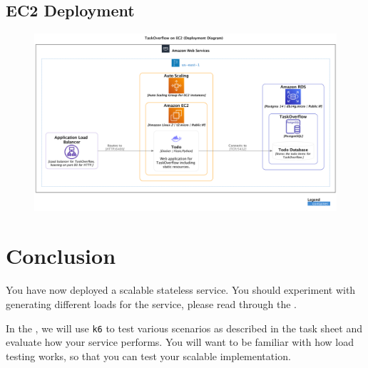 \documentclass{csse4400}
\begin{document}
\subsection{EC2 Deployment}


\begin{figure}[H]
  \includegraphics[trim=0 230 0 0,clip,width=\textwidth]{diagrams/ec2deployment}
\end{figure}


\section{Conclusion}
You have now deployed a scalable stateless service.
You should experiment with generating different loads for the service,
please read through the .

In the ,
we will use \texttt{k6} to test various scenarios as described in the task sheet and evaluate how your service performs.
You will want to be familiar with how load testing works,
so that you can test your scalable implementation.




\end{document}
